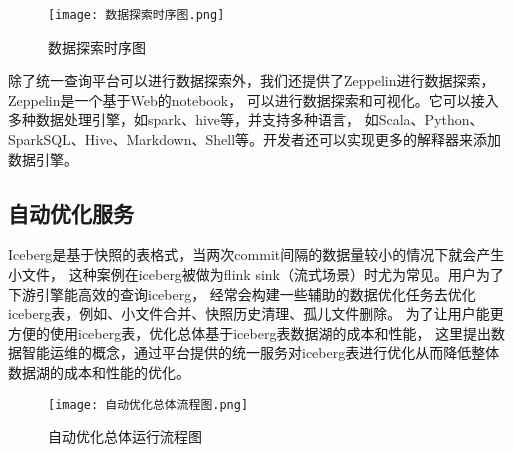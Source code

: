 \begin{figure}[H]
  \centering
  \texttt{[image: 数据探索时序图.png]}
  \caption{数据探索时序图}
  \label{fig:数据探索时序图}
\end{figure}

除了统一查询平台可以进行数据探索外，我们还提供了Zeppelin进行数据探索，Zeppelin是一个基于Web的notebook，
可以进行数据探索和可视化。它可以接入多种数据处理引擎，如spark、hive等，并支持多种语言，
如Scala、Python、SparkSQL、Hive、Markdown、Shell等。开发者还可以实现更多的解释器来添加数据引擎。

\subsection{自动优化服务}

Iceberg是基于快照的表格式，当两次commit间隔的数据量较小的情况下就会产生小文件，
这种案例在iceberg被做为flink sink（流式场景）时尤为常见。用户为了下游引擎能高效的查询iceberg，
经常会构建一些辅助的数据优化任务去优化iceberg表，例如、小文件合并、快照历史清理、孤儿文件删除。
为了让用户能更方便的使用iceberg表，优化总体基于iceberg表数据湖的成本和性能，
这里提出数据智能运维的概念，通过平台提供的统一服务对iceberg表进行优化从而降低整体数据湖的成本和性能的优化。

\begin{figure}[H]
  \centering
  \texttt{[image: 自动优化总体流程图.png]}
  \caption{自动优化总体运行流程图}
  \label{fig:自动优化总体运行流程图}
\end{figure}

